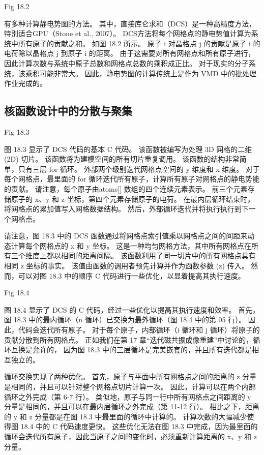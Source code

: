 {\color{red} Fig 18.2}

有多种计算静电势图的方法。 其中，直接库仑求和（DCS）是一种高精度方法，特别适合GPU（Stone et al., 2007）。 
DCS方法将每个网格点的静电势值计算为系统中所有原子的贡献之和。 
如图 18.2 所示。 原子 i 对晶格点 j 的贡献是原子 i 的电荷除以晶格点 j 到原子 i 的距离。 
由于这需要对所有网格点和所有原子进行，因此计算次数与系统中原子总数和网格点总数的乘积成正比。 
对于现实的分子系统，该乘积可能非常大。 因此，静电势图的计算传统上是作为 VMD 中的批处理作业完成的。

\subsection{核函数设计中的分散与聚集}
{\color{red} Fig 18.3}

图 18.3 显示了 DCS 代码的基本 C 代码。 该函数被编写为处理 3D 网格的二维 (2D) 切片。 
该函数将为建模空间的所有切片重复调用。 该函数的结构非常简单，只有三层 for 循环。 
外部两个级别迭代网格点空间的 y 维度和 x 维度。 
对于每个网格点，最里面的 for 循环迭代所有原子，计算所有原子对网格点的静电势能的贡献。 
请注意，每个原子由atoms[] 数组的四个连续元素表示。 前三个元素存储原子的 x、y 和 z 坐标，第四个元素存储原子的电荷。 
在最内层循环结束时，将网格点的累加值写入网格数据结构。 然后，外部循环迭代并将执行执行到下一个网格点。

请注意，图 18.3 中的 DCS 函数通过将网格点索引值乘以网格点之间的间距来动态计算每个网格点的 x 和 y 坐标。 
这是一种均匀网格方法，其中所有网格点在所有三个维度上都以相同的距离间隔。 
该函数利用了同一切片中的所有网格点具有相同 z 坐标的事实。 该值由函数的调用者预先计算并作为函数参数 (z) 传入。 
然而，可以对图 18.3 中的顺序 C 代码进行一些优化，以显着提高其执行速度。

{\color{red} Fig 18.4}

图 18.4 显示了 DCS 的 C 代码，经过一些优化以提高其执行速度和效率。 
首先，图 18.3 中的最内循环（n 循环）已交换为最外循环（图 18.4 中的第 05 行）。 因此，代码会迭代所有原子。 
对于每个原子，内部循环（i 循环和 j 循环）将原子的贡献分散到所有网格点。 
正如我们在第 17 章“迭代磁共振成像重建”中讨论的，循环互换是允许的，
因为图 18.3 中的三层循环是完美嵌套的，并且所有迭代都是相互独立的。

循环交换实现了两种优化。 首先，原子与平面中所有网格点之间的距离的 z 分量是相同的，并且可以针对整个网格点切片计算一次。 
因此，计算可以在两个内部循环之外完成（第 6-7 行）。 
类似地，原子与同一行中所有网格点之间距离的 y 分量是相同的，并且可以在最内层循环之外完成（第 11-12 行）。 
相比之下，距离的 y 和 z 分量都是在图 18.3 中最里面的循环中计算的。 计算次数的大幅减少使得图 18.4 中的 C 代码速度更快。 
这些优化无法在图 18.3 中完成，因为最里面的循环会迭代所有原子，因此当原子之间的变化时，必须重新计算距离的 x、y 和 z 分量。

